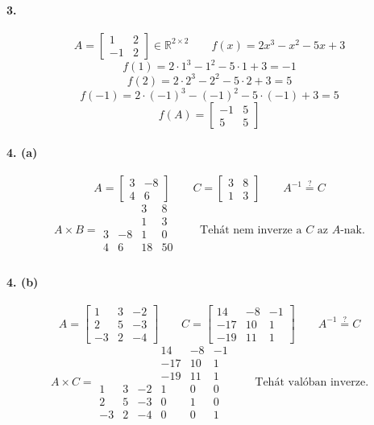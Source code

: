 \documentclass[12pt,a4paper,fleqn]{article}
\newcommand{\myparagraph}[1]{\paragraph{#1}\mbox{}}
\begin{document}
\myparagraph{3.}
\[
  A = \begin{bmatrix} 1 & 2 \\ -1 & 2 \end{bmatrix} \in \mathbb{R}^{2 \times 2}
  \qquad
  f(x) = 2x^3 - x^2 - 5x + 3
\]
\[ f(1) = 2 \cdot 1^3 - 1^2 - 5 \cdot 1 + 3 = -1 \]
\[ f(2) = 2 \cdot 2^3 - 2^2 - 5 \cdot 2 + 3 = 5 \]
\[ f(-1) = 2 \cdot (-1)^3 - (-1)^2 - 5 \cdot (-1  ) + 3 = 5 \]
\[ f(A) = \begin{bmatrix} -1 & 5 \\ 5 & 5 \end{bmatrix} \]


\myparagraph{4. (a)}
\[
  A = \begin{bmatrix} 3 & -8 \\ 4 & 6 \end{bmatrix} \qquad
  C = \begin{bmatrix} 3 & 8 \\ 1 & 3 \end{bmatrix} \qquad
  A^{-1} \stackrel{?}{=} C
\]
\[
  A \times B =
  \begin{array}{cc|cc}
     &    &  3 &  8 \\
     &    &  1 &  3 \\ \hline
   3 & -8 &  1 &  0 \\
   4 &  6 & 18 & 50 \\
  \end{array}
  \qquad
  \text{Tehát nem inverze a $C$ az $A$-nak.}
\]

\myparagraph{4. (b)}
\[
  A =
  \begin{bmatrix}
    1 & 3 & -2 \\
    2 & 5 & -3 \\
    -3 & 2 & -4
  \end{bmatrix}
  \qquad
  C =
  \begin{bmatrix}
    14 & -8 & -1 \\
    -17 & 10 & 1 \\
    -19 & 11 & 1
  \end{bmatrix}
  \qquad
  A^{-1} \stackrel{?}{=} C
\]
\[
  A \times C =
  \begin{array}{ccc|ccc}
      &   &    & 14  & -8 & -1 \\
      &   &    & -17 & 10 & 1 \\
      &   &    & -19 & 11 & 1 \\ \hline
   1  & 3 & -2 & 1   & 0 & 0 \\
   2  & 5 & -3 & 0   & 1 & 0 \\
   -3 & 2 & -4 & 0   & 0 & 1
  \end{array}
  \qquad \text{Tehát valóban inverze.}
\]
\end{document}
